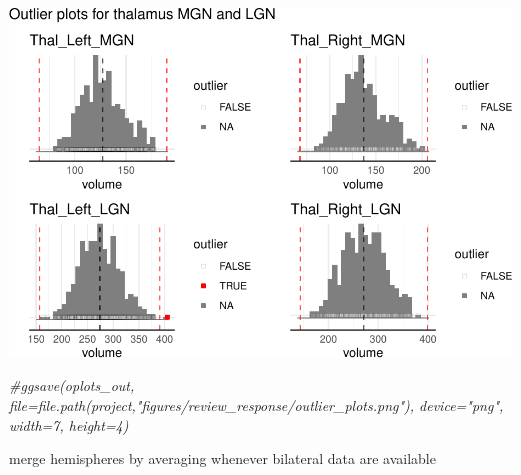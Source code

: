 \documentclass[
]{article}
\newenvironment{Shaded}{\begin{snugshade}}{\end{snugshade}}
\newcommand{\AttributeTok}[1]{\textcolor[rgb]{0.77,0.63,0.00}{#1}}
\newcommand{\CommentTok}[1]{\textcolor[rgb]{0.56,0.35,0.01}{\textit{#1}}}
\newcommand{\FunctionTok}[1]{\textcolor[rgb]{0.00,0.00,0.00}{#1}}
\newcommand{\NormalTok}[1]{#1}
\newcommand{\OtherTok}[1]{\textcolor[rgb]{0.56,0.35,0.01}{#1}}
\newcommand{\SpecialCharTok}[1]{\textcolor[rgb]{0.00,0.00,0.00}{#1}}
\newcommand{\StringTok}[1]{\textcolor[rgb]{0.31,0.60,0.02}{#1}}
\begin{document}
\begin{Shaded}
\end{Shaded}

\includegraphics{22q_subcort_volumes_revised_files/figure-latex/unnamed-chunk-6-1.pdf}

\begin{Shaded}
\begin{Highlighting}[]
\CommentTok{\#ggsave(oplots\_out, file=file.path(project,"figures/review\_response/outlier\_plots.png"), device="png", width=7, height=4)}
\end{Highlighting}
\end{Shaded}

merge hemispheres by averaging whenever bilateral data are available
\end{document}

